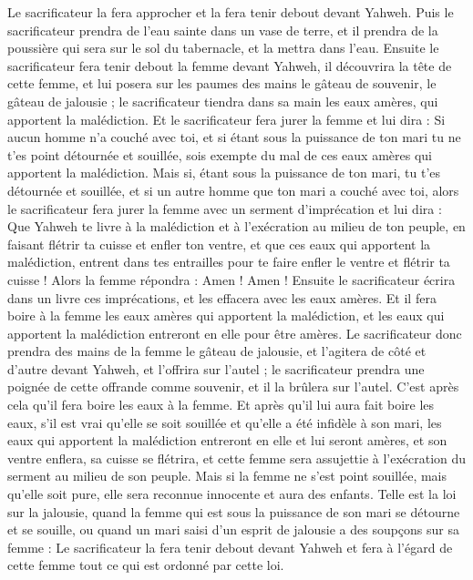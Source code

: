 \begin{multicols}{2}
Le sacrificateur la fera approcher et la fera tenir debout devant Yahweh.
Puis le sacrificateur prendra de l'eau sainte dans un vase de terre, et il prendra de la poussière qui sera sur le sol du tabernacle, et la mettra dans l'eau.
Ensuite le sacrificateur fera tenir debout la femme devant Yahweh, il découvrira la tête de cette femme, et lui posera sur les paumes des mains le gâteau de souvenir, le gâteau de jalousie ; le sacrificateur tiendra dans sa main les eaux amères, qui apportent la malédiction.
Et le sacrificateur fera jurer la femme et lui dira : Si aucun homme n'a couché avec toi, et si étant sous la puissance de ton mari tu ne t'es point détournée et souillée, sois exempte du mal de ces eaux amères qui apportent la malédiction.
Mais si, étant sous la puissance de ton mari, tu t'es détournée et souillée, et si un autre homme que ton mari a couché avec toi,
alors le sacrificateur fera jurer la femme avec un serment d'imprécation et lui dira : Que Yahweh te livre à la malédiction et à l'exécration au milieu de ton peuple, en faisant flétrir ta cuisse et enfler ton ventre,
et que ces eaux qui apportent la malédiction, entrent dans tes entrailles pour te faire enfler le ventre et flétrir ta cuisse ! Alors la femme répondra : Amen ! Amen !
Ensuite le sacrificateur écrira dans un livre ces imprécations, et les effacera avec les eaux amères.
Et il fera boire à la femme les eaux amères qui apportent la malédiction, et les eaux qui apportent la malédiction entreront en elle pour être amères.
Le sacrificateur donc prendra des mains de la femme le gâteau de jalousie, et l'agitera de côté et d'autre devant Yahweh, et l'offrira sur l'autel ;
le sacrificateur prendra une poignée de cette offrande comme souvenir, et il la brûlera sur l'autel. C'est après cela qu'il fera boire les eaux à la femme.
Et après qu'il lui aura fait boire les eaux, s'il est vrai qu'elle se soit souillée et qu'elle a été infidèle à son mari, les eaux qui apportent la malédiction entreront en elle et lui seront amères, et son ventre enflera, sa cuisse se flétrira, et cette femme sera assujettie à l'exécration du serment au milieu de son peuple.
Mais si la femme ne s'est point souillée, mais qu'elle soit pure, elle sera reconnue innocente et aura des enfants.
Telle est la loi sur la jalousie, quand la femme qui est sous la puissance de son mari se détourne et se souille,
ou quand un mari saisi d'un esprit de jalousie a des soupçons sur sa femme : Le sacrificateur la fera tenir debout devant Yahweh et fera à l'égard de cette femme tout ce qui est ordonné par cette loi.

\end{multicols}
